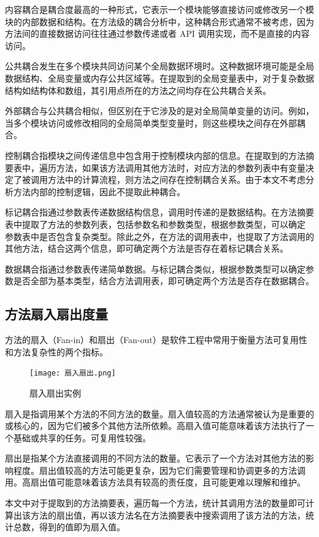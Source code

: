 内容耦合是耦合度最高的一种形式，它表示一个模块能够直接访问或修改另一个模块的内部数据和结构。在方法级的耦合分析中，这种耦合形式通常不被考虑，因为方法间的直接数据访问往往通过参数传递或者 API 调用实现，而不是直接的内容访问。

公共耦合发生在多个模块共同访问某个全局数据环境时。这种数据环境可能是全局数据结构、全局变量或内存公共区域等。在提取到的全局变量表中，对于复杂数据结构如结构体和数组，其引用点所在的方法之间均存在公共耦合关系。


外部耦合与公共耦合相似，但区别在于它涉及的是对全局简单变量的访问。例如，当多个模块访问或修改相同的全局简单类型变量时，则这些模块之间存在外部耦合。


控制耦合指模块之间传递信息中包含用于控制模块内部的信息。在提取到的方法摘
要表中，遍历方法，如果该方法调用其他方法时，对应方法的参数列表中有变量决定了被调用方法中的计算流程，则方法之间存在控制耦合关系。由于本文不考虑分析方法内部的控制逻辑，因此不提取此种耦合。


标记耦合指通过参数表传递数据结构信息，调用时传递的是数据结构。在方法摘要
表中提取了方法的参数列表，包括参数名和参数类型，根据参数类型，可以确定
参数表中是否包含复杂类型。除此之外，在方法的调用表中，也提取了方法调用的
其他方法，结合这两个信息，即可确定两个方法是否存在着标记耦合关系。


数据耦合指通过参数表传递简单数据。与标记耦合类似，根据参数类型可以确定参
数是否全部为基本类型，结合方法调用表，即可确定两个方法是否存在数据耦合。

\subsection{方法扇入扇出度量}

方法的扇入（Fan-in）和扇出（Fan-out）是软件工程中常用于衡量方法可复用性和方法复杂性的两个指标。

\begin{figure}[h]
\centering
\texttt{[image: 扇入扇出.png]}
\caption{扇入扇出实例}
\end{figure}

扇入是指调用某个方法的不同方法的数量。扇入值较高的方法通常被认为是重要的或核心的，因为它们被多个其他方法所依赖。高扇入值可能意味着该方法执行了一个基础或共享的任务。可复用性较强。


扇出是指某个方法直接调用的不同方法的数量。它表示了一个方法对其他方法的影
响程度。扇出值较高的方法可能更复杂，因为它们需要管理和协调更多的方法调用。高扇出值可能意味着该方法具有较高的责任度，且可能更难以理解和维护。


本文中对于提取到的方法摘要表，遍历每一个方法，统计其调用方法的数量即可计算出该方法的扇出值，再以该方法名在方法摘要表中搜索调用了该方法的方法，统计总数，得到的值即为扇入值。

